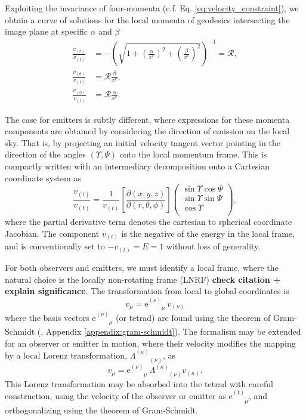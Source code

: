 \documentclass[fleqn,usenatbib]{mnras}
\newcommand{\todo}[1]{{\bf \color{red} #1}}
\newcommand{\e}{\text{e}}
\newcommand{\utensor}[3]{#1^{#2}_{\phantom{#2}#3}}
\newcommand{\pderiv}[2]{\frac{\partial #1}{\partial #2}}
\begin{document}
Exploiting the invariance of four-momenta (c.f. Eq.
\eqref{eq:velocity_constraint}), we obtain a curve of solutions for the local
momenta of geodesics intersecting the image plane at specific $\alpha$ and
$\beta$
\begin{align}
    \frac{v_{(r)}}{v_{(t)}} &= -\left( \sqrt{1 + \left(\frac{\alpha}{x^r}\right)^2 + \left(\frac{\beta}{x^r}\right)^2} \right)^{-1} = \mathscr{R}, \\
    \frac{v_{(\theta)}}{v_{(t)}} &= \mathscr{R} \frac{\beta}{x^r}, \\
    \frac{v_{(\phi)}}{v_{(t)}} &= \mathscr{R} \frac{\alpha}{x^r}.
\end{align}

The case for emitters is subtly different, where expressions for these momenta
components are obtained by considering the direction of emission on the local
sky. That is, by projecting an initial velocity tangent vector pointing in the
direction of the angles $(\Upsilon, \Psi)$ onto the local momentum frame.  This
is compactly written with an intermediary decomposition onto a Cartesian
coordinate system as
\begin{equation}
    \label{eq:local-angle-to-velocity}
    \frac{v_{(i)}}{v_{(t)}} = \frac{1}{v_{(t)}}
    \left[\pderiv{(x, y, z)}{(r, \theta, \phi)}\right]
    \left(
    \begin{matrix}
        \sin \Upsilon \cos \Psi \\
        \sin \Upsilon \sin \Psi \\
        \cos \Upsilon \\
    \end{matrix}
    \right),
\end{equation}
where the partial derivative term denotes the cartesian to spherical coordinate
Jacobian. The component $v_{(t)}$ is the negative of the energy in the local
frame, and is conventionally set to $-v_{(t)}=E=1$ without loss of generality. 

For both observers and emitters, we must identify a local frame, where the
natural choice is the locally non-rotating frame (LNRF)
\citep{bardeen_rotating_1972} \todo{check citation + explain significance}. The
transformation from local to global coordinates is
\begin{equation}
    \label{eq:local-to-global-velocity}
    v_\mu = \e^{(\nu)}_{\phantom{(\nu)}\mu}\  v_{(\nu)}
\end{equation}
where the basis vectors $\e^{(\nu)}_{\phantom{(\nu)}\mu}$ (or tetrad) are found
using the theorem of Gram-Schmidt (\citealp{schmidt_uber_1989}, Appendix
\ref{appendix:gram-schmidt}). The formalism may be extended for an observer or
emitter in motion, where their velocity modifies the mapping by a local Lorenz
transformation, $\Lambda^{(\kappa)}_{\phantom{(\kappa)}(\nu)}$, as 
\begin{equation}
    v_\mu = \e^{(\nu)}_{\phantom{(\nu)}\mu}\  \Lambda^{(\kappa)}_{\phantom{(a)}(\nu)} v_{(\kappa)}.
\end{equation}
This Lorenz transformation may be absorbed into the tetrad with careful
construction, using the velocity of the observer or emitter as
$\utensor{\e}{(t)}{\mu}$, and orthogonalizing using the theorem of Gram-Schmidt.
\end{document}
